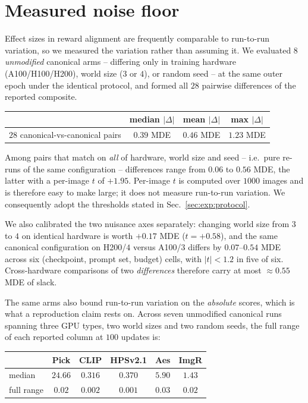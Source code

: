 \section{Measured noise floor}
\label{app:floor}

Effect sizes in reward alignment are frequently comparable to run-to-run variation, so we
measured the variation rather than assuming it. We evaluated $8$ \emph{unmodified}
canonical arms -- differing only in training hardware (A100/H100/H200), world size ($3$ or
$4$), or random seed -- at the same outer epoch under the identical protocol, and formed
all $28$ pairwise differences of the reported composite.

\begin{center}
\begin{tabular}{lccc}
\toprule
& median $|\Delta|$ & mean $|\Delta|$ & max $|\Delta|$\\
\midrule
$28$ canonical-vs-canonical pairs & $0.39$ MDE & $0.46$ MDE & $1.23$ MDE\\
\bottomrule
\end{tabular}
\end{center}

Among pairs that match on \emph{all} of hardware, world size and seed -- i.e.\ pure
re-runs of the same configuration -- differences range from $0.06$ to $0.56$ MDE, the
latter with a per-image $t$ of $+1.95$. Per-image $t$ is computed over $1000$ images and
is therefore easy to make large; it does not measure run-to-run variation. We consequently
adopt the thresholds stated in Sec.~\ref{sec:exp:protocol}.

We also calibrated the two nuisance axes separately: changing world size from $3$ to $4$
on identical hardware is worth $+0.17$ MDE ($t=+0.58$), and the same canonical
configuration on H200/$4$ versus A100/$3$ differs by $0.07$--$0.54$ MDE across six
(checkpoint, prompt set, budget) cells, with $|t|<1.2$ in five of six. Cross-hardware
comparisons of two \emph{differences} therefore carry at most $\approx0.55$ MDE of slack.

The same arms also bound run-to-run variation on the \emph{absolute} scores, which is what
a reproduction claim rests on. Across seven unmodified canonical runs spanning three GPU
types, two world sizes and two random seeds, the full range of each reported column at
$100$ updates is:

\begin{center}
\begin{tabular}{lccccc}
\toprule
& Pick & CLIP & HPSv2.1 & Aes & ImgR\\
\midrule
median & $24.66$ & $0.316$ & $0.370$ & $5.90$ & $1.43$\\
full range & $0.02$ & $0.002$ & $0.001$ & $0.03$ & $0.02$\\
\bottomrule
\end{tabular}
\end{center}

